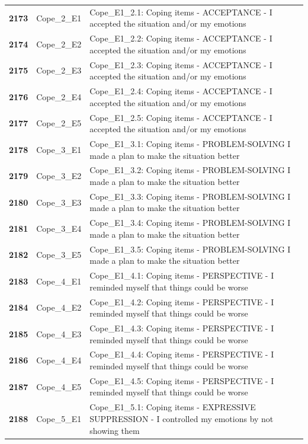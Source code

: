 \documentclass[
  letterpaper,
  DIV=11,
  numbers=noendperiod]{scrartcl}
\begin{document}
\begin{longtable}[t]{>{}cll}
\textbf{2173} & Cope\_2\_E1 & Cope\_E1\_2.1: Coping items - ACCEPTANCE - I accepted the situation and/or my emotions\\
\textbf{2174} & Cope\_2\_E2 & Cope\_E1\_2.2: Coping items - ACCEPTANCE - I accepted the situation and/or my emotions\\
\textbf{2175} & Cope\_2\_E3 & Cope\_E1\_2.3: Coping items - ACCEPTANCE - I accepted the situation and/or my emotions\\
\addlinespace
\textbf{2176} & Cope\_2\_E4 & Cope\_E1\_2.4: Coping items - ACCEPTANCE - I accepted the situation and/or my emotions\\
\textbf{2177} & Cope\_2\_E5 & Cope\_E1\_2.5: Coping items - ACCEPTANCE - I accepted the situation and/or my emotions\\
\textbf{2178} & Cope\_3\_E1 & Cope\_E1\_3.1: Coping items - PROBLEM-SOLVING I made a plan to make the situation better\\
\textbf{2179} & Cope\_3\_E2 & Cope\_E1\_3.2: Coping items - PROBLEM-SOLVING I made a plan to make the situation better\\
\textbf{2180} & Cope\_3\_E3 & Cope\_E1\_3.3: Coping items - PROBLEM-SOLVING I made a plan to make the situation better\\
\addlinespace
\textbf{2181} & Cope\_3\_E4 & Cope\_E1\_3.4: Coping items - PROBLEM-SOLVING I made a plan to make the situation better\\
\textbf{2182} & Cope\_3\_E5 & Cope\_E1\_3.5: Coping items - PROBLEM-SOLVING I made a plan to make the situation better\\
\textbf{2183} & Cope\_4\_E1 & Cope\_E1\_4.1: Coping items - PERSPECTIVE - I reminded myself that things could be worse\\
\textbf{2184} & Cope\_4\_E2 & Cope\_E1\_4.2: Coping items - PERSPECTIVE - I reminded myself that things could be worse\\
\textbf{2185} & Cope\_4\_E3 & Cope\_E1\_4.3: Coping items - PERSPECTIVE - I reminded myself that things could be worse\\
\addlinespace
\textbf{2186} & Cope\_4\_E4 & Cope\_E1\_4.4: Coping items - PERSPECTIVE - I reminded myself that things could be worse\\
\textbf{2187} & Cope\_4\_E5 & Cope\_E1\_4.5: Coping items - PERSPECTIVE - I reminded myself that things could be worse\\
\textbf{2188} & Cope\_5\_E1 & Cope\_E1\_5.1: Coping items - EXPRESSIVE SUPPRESSION - I controlled my emotions by not showing them\\

\end{longtable}
\end{document}

